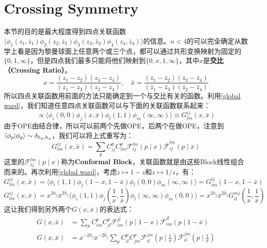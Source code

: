 \section{Crossing Symmetry}
本节的目的是最大程度得到四点关联函数$\langle\phi_1(z_1,\bar{z}_1)\phi_2(z_2,\bar{z}_2)\phi_3(z_3,\bar{z}_3)\phi_4(z_4,\bar{z}_4)\rangle $的信息。$n<4$的可以完全确定从数学上看是因为黎曼球面上任意两个或三个点，都可以通过共形变换映射为固定的$\{0,1,\infty\}$，但是四点我们最多只能将他们映射到$\{0,x,1,\infty\}$，其中$x$是\textbf{交比（Crossing Ratio）}。
\begin{equation}
	x=\frac{(z_1-z_2)(z_3-z_4)}{(z_1-z_3)(z_2-z_4)},\quad\bar{x}=\frac{(\bar{z}_1-\bar{z}_2)(\bar{z}_3-\bar{z}_4)}{(\bar{z}_1-\bar{z}_3)(\bar{z}_2-\bar{z}_4)}
\end{equation}
所以四点关联函数用前面的方法只能确定到一个与交比有关的函数。利用\ref{global ward}，我们知道任意四点关联函数可以与下面的关联函数联系起来：
\begin{equation}
	\propto \langle\phi_i(0,0)\phi_j(x,\bar x)\phi_l(1,1)\phi_m(\infty,\infty)\rangle\equiv G^{ij}_{lm}(x,\bar x)
\end{equation}
由于OPE由结合律，所以可以前两个先做OPE，后两个在做OPE，注意到$\braket{\phi_p}{\phi_q}\sim\delta_{h_p,h_q}$，我们可以将上式重写为：
\begin{equation}\label{32.3}
	G^{ij}_{lm}(x,\bar x)=\sum_pC_{ij}^pC_{lm}^p\mathcal{F}_{ij}^{lm}(p\mid x)\overline{\mathcal{F}}_{ij}^{lm}(p\mid\overline{x})
\end{equation}
这里的$\mathcal{F}_{ij}^{lm}(p\mid x)$称为\textbf{Conformal Block}，关联函数就是由这些Block线性组合而来的。再次利用\ref{global ward}，考虑$z\mapsto 1-z$和$z\mapsto 1/z$，有：
\begin{equation}
	G^{ij}_{lm}(x,\bar x)=\langle\phi_i(1,1)\phi_j(1-x,1-\bar x)\phi_l(0,0)\phi_m(\infty,\infty)\rangle= G^{lj}_{im}(1-x,1-\bar x)
\end{equation}
\begin{equation}
	G^{ij}_{lm}(x,\bar x)=x^{2h_j}\bar x^{2\bar h_j}\langle\phi_i(1,1)\phi_j(\frac{1}{x},\frac{1}{\bar x})\phi_l(\infty,\infty)\phi_m(0,0)\rangle= x^{2h_j}\bar x^{2\bar h_j}G^{mj}_{il}(\frac{1}{x},\frac{1}{\bar x})
\end{equation}
这让我们得到另外两个$G(x,\bar x)$的表达式：
\begin{align}
	\label{32.6} G(x,\bar x)&=\sum_pC_{im}^pC_{jl}^p\mathcal{F}_{im}^{jl}(p\mid1-x)\overline{\mathcal{F}}_{im}^{jl}(p\mid1-\overline{x})\\
	\label{32.7} G\left(x,\bar x\right)&=x^{-2h_j}\overline{x}^{-2\overline{h}_j}\sum_pC_{il}^pC_{jm}^p\mathcal{F}_{il}^{jm}\left(p\mid\frac1x\right)\overline{\mathcal{F}}_{il}^{jm}\left(p\mid\frac1{\overline{x}}\right)
\end{align}
